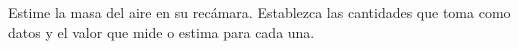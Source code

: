 \item Estime la masa del aire en su recámara. Establezca las cantidades que toma como datos y el valor que mide o estima para cada una.
